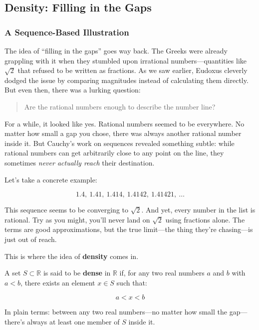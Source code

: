 \subsection{Density: Filling in the Gaps}

\subsubsection{A Sequence-Based Illustration}


The idea of “filling in the gaps” goes way back. The Greeks were already grappling with it when they stumbled upon irrational numbers—quantities like \( \sqrt{2} \) that refused to be written as fractions. As we saw earlier, Eudoxus cleverly dodged the issue by comparing magnitudes instead of calculating them directly. But even then, there was a lurking question:

\begin{quote}
Are the rational numbers enough to describe the number line?
\end{quote}

For a while, it looked like yes. Rational numbers seemed to be everywhere. No matter how small a gap you chose, there was always another rational number inside it. But Cauchy’s work on sequences revealed something subtle: while rational numbers can get arbitrarily close to any point on the line, they sometimes \textit{never actually reach} their destination.

Let’s take a concrete example:

\[
1.4,\ 1.41,\ 1.414,\ 1.4142,\ 1.41421,\ \dots
\]

This sequence seems to be converging to \( \sqrt{2} \). And yet, every number in the list is rational. Try as you might, you’ll never land on \( \sqrt{2} \) using fractions alone. The terms are good approximations, but the true limit—the thing they’re chasing—is just out of reach.

This is where the idea of \textbf{density} comes in.

A set \( S \subset \mathbb{R} \) is said to be \textbf{dense} in \( \mathbb{R} \) if, for any two real numbers \( a \) and \( b \) with \( a < b \), there exists an element \( x \in S \) such that:

\[
a < x < b
\]

In plain terms: between any two real numbers—no matter how small the gap—there’s always at least one member of \( S \) inside it.


